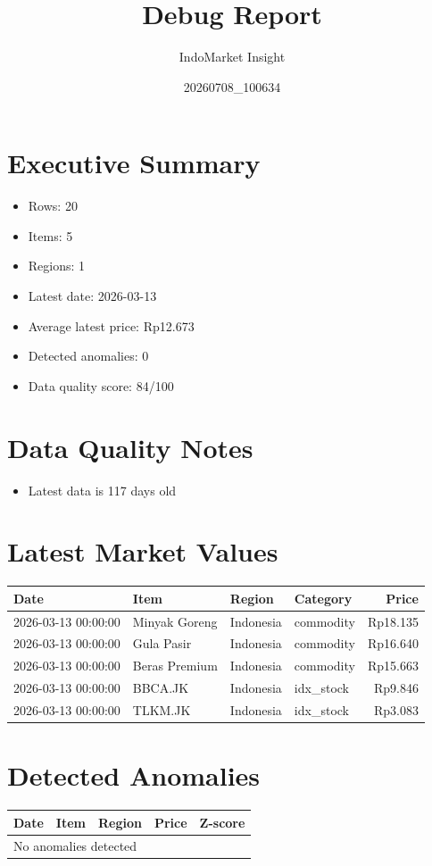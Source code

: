 \documentclass[11pt,a4paper]{article}
\title{Debug Report}
\author{IndoMarket Insight}
\date{20260708_100634}
\begin{document}
\maketitle

\section*{Executive Summary}
\begin{itemize}
    \item Rows: 20
    \item Items: 5
    \item Regions: 1
    \item Latest date: 2026-03-13
    \item Average latest price: Rp12.673
    \item Detected anomalies: 0
    \item Data quality score: 84/100
\end{itemize}

\section*{Data Quality Notes}
\begin{itemize}
\item Latest data is 117 days old
\end{itemize}

\section*{Latest Market Values}
\begin{longtable}{llllr}
\toprule
Date & Item & Region & Category & Price \\
\midrule
2026-03-13 00:00:00 & Minyak Goreng & Indonesia & commodity & Rp18.135 \\ 
2026-03-13 00:00:00 & Gula Pasir & Indonesia & commodity & Rp16.640 \\ 
2026-03-13 00:00:00 & Beras Premium & Indonesia & commodity & Rp15.663 \\ 
2026-03-13 00:00:00 & BBCA.JK & Indonesia & idx\_stock & Rp9.846 \\ 
2026-03-13 00:00:00 & TLKM.JK & Indonesia & idx\_stock & Rp3.083 \\ 
\bottomrule
\end{longtable}

\section*{Detected Anomalies}
\begin{longtable}{llllr}
\toprule
Date & Item & Region & Price & Z-score \\
\midrule
\multicolumn{5}{l}{No anomalies detected} \\ 
\bottomrule
\end{longtable}
\end{document}
